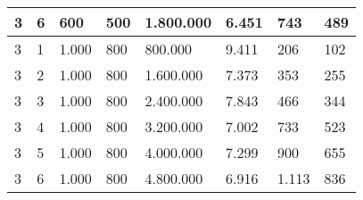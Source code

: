 {\begin{landscape}
\begin{table}[]
\begin{tabular}{|l|l|l|l|l|l|l|l|}
3                   & 6                & 600            & 500           & 1.800.000       & 6.451           & 743          & 489  \\ \hline
3                   & 1                & 1.000          & 800           & 800.000         & 9.411           & 206          & 102  \\ \hline
3                   & 2                & 1.000          & 800           & 1.600.000       & 7.373           & 353          & 255  \\ \hline
3                   & 3                & 1.000          & 800           & 2.400.000       & 7.843           & 466          & 344  \\ \hline
3                   & 4                & 1.000          & 800           & 3.200.000       & 7.002           & 733          & 523  \\ \hline
3                   & 5                & 1.000          & 800           & 4.000.000       & 7.299           & 900          & 655  \\ \hline
3                   & 6                & 1.000          & 800           & 4.800.000       & 6.916           & 1.113        & 836  \\ \hline
		\end{tabular}
		\end{table}
	\end{landscape}
\clearpage
}
